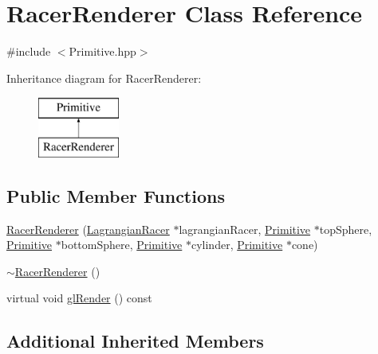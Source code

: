 \hypertarget{class_racer_renderer}{\section{Racer\-Renderer Class Reference}
\label{class_racer_renderer}
}


{\ttfamily \#include $<$Primitive.\-hpp$>$}

Inheritance diagram for Racer\-Renderer\-:\begin{figure}[H]
\begin{center}
\leavevmode
\includegraphics[height=2.000000cm]{class_racer_renderer}
\end{center}
\end{figure}
\subsection*{Public Member Functions}
\begin{DoxyCompactItemize}
\item 
\hyperlink{class_racer_renderer_a4729c12e93c352f2b4edc2bd6fcc49b8}{Racer\-Renderer} (\hyperlink{class_lagrange_1_1_lagrangian_racer}{Lagrangian\-Racer} $\ast$lagrangian\-Racer, \hyperlink{class_primitive}{Primitive} $\ast$top\-Sphere, \hyperlink{class_primitive}{Primitive} $\ast$bottom\-Sphere, \hyperlink{class_primitive}{Primitive} $\ast$cylinder, \hyperlink{class_primitive}{Primitive} $\ast$cone)
\item 
\hyperlink{class_racer_renderer_a12543cdf5d7eddd004de136b4aa2817d}{$\sim$\-Racer\-Renderer} ()
\item 
virtual void \hyperlink{class_racer_renderer_acd7981861dda4a5507f0771e5a3dff19}{gl\-Render} () const 
\end{DoxyCompactItemize}
\subsection*{Additional Inherited Members}


